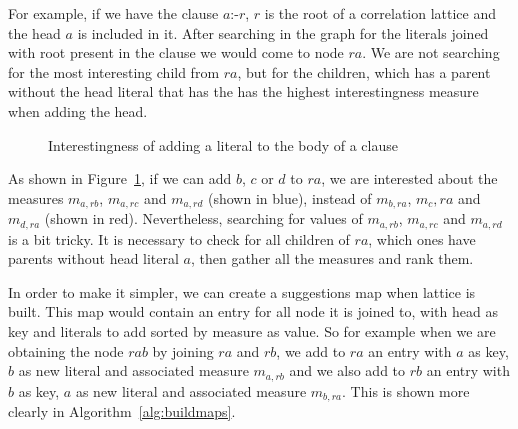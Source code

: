 For example, if we have the clause $a$:-$r$, $r$ is the root of a correlation lattice and the head $a$ is included in
it. After searching in the graph for the literals joined with root present in the clause we would come to node
$ra$. We are not searching for the most interesting child from $ra$, but for the children, which has a parent without
the head literal that has the has the highest interestingness measure when adding the head.

\begin{figure}[!h]
  \caption{Interestingness of adding a literal to the body of a clause}
  \centering
  \label{fig:latticeSuggestion}
\end{figure}

As shown in Figure~\ref{fig:latticeSuggestion}, if we can add $b$, $c$ or $d$ to $ra$, we are interested about the
measures $m_{a,rb}$, $m_{a,rc}$ and $m_{a,rd}$ (shown in blue), instead of $m_{b,ra}$, $m_c,ra$ and $m_{d,ra}$ (shown in
red). Nevertheless, searching for values of $m_{a,rb}$, $m_{a,rc}$ and $m_{a,rd}$ is a bit tricky. It is necessary to
check for all children of $ra$, which ones have parents without head literal $a$, then gather all the measures and rank
them.

In order to make it simpler, we can create a suggestions map when lattice is built. This map would contain an entry for
all node it is joined to, with head as key and literals to add sorted by measure as value. So for example when we are
obtaining the node $rab$ by joining $ra$ and $rb$, we add to $ra$ an entry with $a$ as key, $b$ as new literal and
associated measure $m_{a,rb}$ and we also add to $rb$ an entry with $b$ as key, $a$ as new literal and associated
measure $m_{b,ra}$. This is shown more clearly in Algorithm~\ref{alg:buildmaps}.

